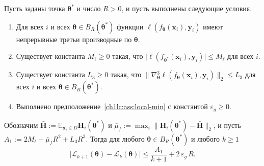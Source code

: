 \begin{theorem}\label{ch1lc:thm:increment-bound}
Пусть заданы точка $\boldsymbol{\theta}^*$ и число $R>0$, и пусть выполнены следующие условия.
\begin{enumerate}[1)]
\item Для всех $i$ и всех $\boldsymbol{\theta}\in B_R(\boldsymbol{\theta}^*)$ функции $\ell(f_{\boldsymbol{\theta}}(\mathbf{x}_i),\mathbf{y}_i)$ имеют непрерывные третьи производные по $\boldsymbol{\theta}$.
\item Существует константа $M_\ell\ge 0$ такая, что $\bigl|\ell(f_{\boldsymbol{\theta}^*}(\mathbf{x}_i),\mathbf{y}_i)\bigr|\le M_\ell$ для всех $i$.
\item Существует константа $L_3\ge 0$ такая, что $\bigl\|\nabla\!^{3}_{\boldsymbol{\theta}}\ell(f_{\boldsymbol{\theta}}(\mathbf{x}_i),\mathbf{y}_i)\bigr\|_2\le L_3$ для всех $i$ и всех $\boldsymbol{\theta}\in B_R(\boldsymbol{\theta}^*)$.
\item Выполнено предположение~\ref{ch1lc:ass:local-min} с константой $\varepsilon_g\ge 0$.
\end{enumerate}
Обозначим $\bar{\mathbf{H}}:=\mathbb{E}_{\mathbf{x}_i\in D}\mathbf{H}_{i}(\boldsymbol{\theta}^*)$ и
$\bar\mu_f:=\max_i\bigl\|\mathbf{H}_{i}(\boldsymbol{\theta}^*)-\bar{\mathbf{H}}\bigr\|_2$, и пусть
$A_1:=2M_\ell+\bar\mu_f R^2+L_3 R^3$. Тогда для любого $\boldsymbol{\theta}\in B_R(\boldsymbol{\theta}^*)$ и любого $k\ge 1$
\begin{equation}\label{ch1lc:eq:increment-strict}
  \bigl|\mathcal{L}_{k+1}(\boldsymbol{\theta})-\mathcal{L}_k(\boldsymbol{\theta})\bigr|
  \le \frac{A_1}{k+1}+2\,\varepsilon_g\,R .
\end{equation}
\end{theorem}

